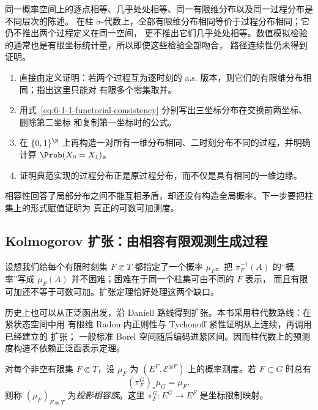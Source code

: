 \begin{remark}[四种不同的比较]
同一概率空间上的逐点相等、几乎处处相等、同一有限维分布以及同一过程分布是不同层次的陈述。
在柱 $\sigma$-代数上，全部有限维分布相同等价于过程分布相同；它仍不推出两个过程定义在同一空间，
更不推出它们几乎处处相等。数值模拟检验的通常也是有限坐标统计量，所以即使这些检验全部吻合，
路径连续性仍未得到证明。
\end{remark}

\begin{exercise}
\begin{enumerate}
  \item 直接由定义证明：若两个过程互为逐时刻的 a.s. 版本，则它们的有限维分布相同；指出这里只能对
        有限多个零集取并。
  \item 用式~\eqref{eq:6-1-1-functorial-consistency} 分别写出三坐标分布在交换前两坐标、删除第二坐标
        和复制第一坐标时的公式。
  \item 在 $\{0,1\}^{\N}$ 上再构造一对所有一维分布相同、二时刻分布不同的过程，并明确计算
        $\Prob(X_0=X_1)$。
  \item 证明典范实现的过程分布正是原过程分布，而不仅是具有相同的一维边缘。
\end{enumerate}
\end{exercise}

相容性回答了局部分布之间不能互相矛盾，却还没有构造全局概率。下一步要把柱集上的形式赋值证明为
真正的可数可加测度。


\subsection{Kolmogorov 扩张：由相容有限观测生成过程}\label{subsec:6-1-2}

设想我们给每个有限时刻集 $F\Subset T$ 都指定了一个概率 $\mu_F$。把
$\pi_F^{-1}(A)$ 的“概率”写成 $\mu_F(A)$ 并不困难；困难在于同一个柱集可由不同的 $F$ 表示，
而且有限可加还不等于可数可加。扩张定理恰好处理这两个缺口。

历史上也可以从正泛函出发，沿 Daniell 路线得到扩张。本书采用柱代数路线：在紧状态空间中用
有限维 Radon 内正则性与 Tychonoff 紧性证明从上连续，再调用已经建立的 \Caratheodory{} 扩张；
一般标准 Borel 空间随后编码进紧区间。因而柱代数上的预测度构造不依赖正泛函表示定理。

\begin{definition}[投影相容族]\label{def:6-1-2-1}
对每个非空有限集 $F\Subset T$，设 $\mu_F$ 为
$(E^F,\mathcal E^{\otimes F})$ 上的概率测度。若 $F\subset G$ 时总有
\[
  (\pi_F^G)_*\mu_G=\mu_F,
  \tag{6.1.2}\label{eq:6-1-2-projective-consistency}
\]
则称 $(\mu_F)_{F\Subset T}$ 为\emph{投影相容族}。这里
$\pi_F^G:E^G\to E^F$ 是坐标限制映射。
\end{definition}

